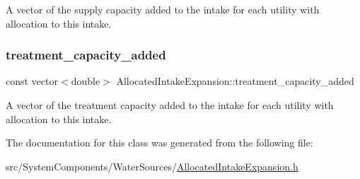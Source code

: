 A vector of the supply capacity added to the intake for each utility with allocation to this intake. 

\mbox{\label{classAllocatedIntakeExpansion_a22f6d50982db1cf862e81672612abdb9}} 
\subsubsection{\texorpdfstring{treatment\+\_\+capacity\+\_\+added}{treatment\_capacity\_added}}
{\footnotesize\ttfamily const vector$<$double$>$ Allocated\+Intake\+Expansion\+::treatment\+\_\+capacity\+\_\+added}



A vector of the treatment capacity added to the intake for each utility with allocation to this intake. 



The documentation for this class was generated from the following file\+:\begin{DoxyCompactItemize}
\item 
src/\+System\+Components/\+Water\+Sources/\mbox{\hyperlink{AllocatedIntakeExpansion_8h}{Allocated\+Intake\+Expansion.\+h}}\end{DoxyCompactItemize}

